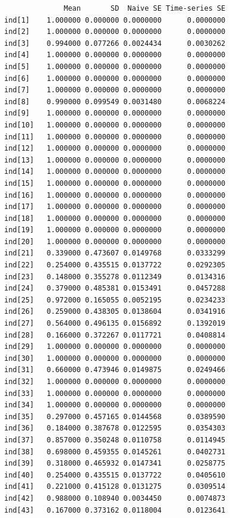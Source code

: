\documentclass{article}
\begin{document}
{\small
\begin{verbatim}
              Mean       SD  Naive SE Time-series SE
ind[1]    1.000000 0.000000 0.0000000      0.0000000
ind[2]    1.000000 0.000000 0.0000000      0.0000000
ind[3]    0.994000 0.077266 0.0024434      0.0030262
ind[4]    1.000000 0.000000 0.0000000      0.0000000
ind[5]    1.000000 0.000000 0.0000000      0.0000000
ind[6]    1.000000 0.000000 0.0000000      0.0000000
ind[7]    1.000000 0.000000 0.0000000      0.0000000
ind[8]    0.990000 0.099549 0.0031480      0.0068224
ind[9]    1.000000 0.000000 0.0000000      0.0000000
ind[10]   1.000000 0.000000 0.0000000      0.0000000
ind[11]   1.000000 0.000000 0.0000000      0.0000000
ind[12]   1.000000 0.000000 0.0000000      0.0000000
ind[13]   1.000000 0.000000 0.0000000      0.0000000
ind[14]   1.000000 0.000000 0.0000000      0.0000000
ind[15]   1.000000 0.000000 0.0000000      0.0000000
ind[16]   1.000000 0.000000 0.0000000      0.0000000
ind[17]   1.000000 0.000000 0.0000000      0.0000000
ind[18]   1.000000 0.000000 0.0000000      0.0000000
ind[19]   1.000000 0.000000 0.0000000      0.0000000
ind[20]   1.000000 0.000000 0.0000000      0.0000000
ind[21]   0.339000 0.473607 0.0149768      0.0333299
ind[22]   0.254000 0.435515 0.0137722      0.0292305
ind[23]   0.148000 0.355278 0.0112349      0.0134316
ind[24]   0.379000 0.485381 0.0153491      0.0457288
ind[25]   0.972000 0.165055 0.0052195      0.0234233
ind[26]   0.259000 0.438305 0.0138604      0.0341916
ind[27]   0.564000 0.496135 0.0156892      0.1392019
ind[28]   0.166000 0.372267 0.0117721      0.0408814
ind[29]   1.000000 0.000000 0.0000000      0.0000000
ind[30]   1.000000 0.000000 0.0000000      0.0000000
ind[31]   0.660000 0.473946 0.0149875      0.0249466
ind[32]   1.000000 0.000000 0.0000000      0.0000000
ind[33]   1.000000 0.000000 0.0000000      0.0000000
ind[34]   1.000000 0.000000 0.0000000      0.0000000
ind[35]   0.297000 0.457165 0.0144568      0.0389590
ind[36]   0.184000 0.387678 0.0122595      0.0354303
ind[37]   0.857000 0.350248 0.0110758      0.0114945
ind[38]   0.698000 0.459355 0.0145261      0.0402731
ind[39]   0.318000 0.465932 0.0147341      0.0258775
ind[40]   0.254000 0.435515 0.0137722      0.0405610
ind[41]   0.221000 0.415128 0.0131275      0.0309514
ind[42]   0.988000 0.108940 0.0034450      0.0074873
ind[43]   0.167000 0.373162 0.0118004      0.0123641
\end{verbatim}}
\end{document}
